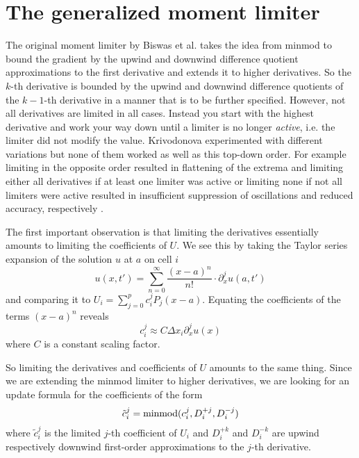 \section{The generalized moment limiter}
\label{sec:moment}

The original moment limiter by Biswas et al. takes the idea from minmod to bound the gradient by the upwind and downwind difference quotient approximations to the first derivative and extends it to higher derivatives.
So the $k$-th derivative is bounded by the upwind and downwind difference quotients of the $k - 1$-th derivative in a manner that is to be further specified.
However, not all derivatives are limited in all cases.
Instead you start with the highest derivative and work your way down until a limiter is no longer \emph{active}, i.e. the limiter did not modify the value.
Krivodonova experimented with different variations but none of them worked as well as this top-down order.
For example limiting in the opposite order resulted in flattening of the extrema and limiting either all derivatives if at least one limiter was active or limiting none if not all limiters were active resulted in insufficient suppression of oscillations and reduced accuracy, respectively \cite[remark 1]{Krivodonova}.

The first important observation is that limiting the derivatives essentially amounts to limiting the coefficients of $U$.
We see this by taking the Taylor series expansion of the solution $u$ at $a$ on cell $i$
\begin{equation*}
  u(x, t') = \sum_{n = 0}^{\infty} \frac{(x - a)^{n}}{n!} \cdot \partial_{x}^{j} u(a, t')
\end{equation*}
and comparing it to $U_{i} = \sum_{j = 0}^{p} c_{i}^{j} P_{j}(x - a)$.
Equating the coefficients of the terms $(x - a)^{n}$ reveals
\begin{equation*}
  c_{i}^{j} \approx C \Delta x_{i} \partial_{x}^{j} u(x)
\end{equation*}
where $C$ is a constant scaling factor.

So limiting the derivatives and coefficients of $U$ amounts to the same thing.
Since we are extending the minmod limiter to higher derivatives, we are looking for an update formula for the coefficients of the form
\begin{equation*}
  \tilde{c}_{i}^{j} = \operatorname{minmod}(c_{i}^{j}, D_{i}^{+j}, D_{i}^{-j})
\end{equation*}
where $\tilde{c}_{i}^{j}$ is the limited $j$-th coefficient of $U_{i}$ and $D_{i}^{+k}$ and $D_{i}^{-k}$ are upwind respectively downwind first-order approximations to the $j$-th derivative.

